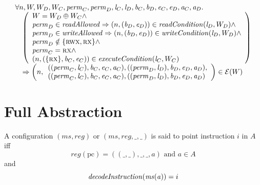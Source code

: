 \documentclass[a3paper]{article}
\newcommand{\npair}[2][n]{\left(#1,#2\right)}
\newcommand{\tand}{\text{ and }}
\newcommand{\typesetlr}[1]{\mathcal{#1}}
\newcommand{\lre}{\typesetlr{E}}
\newcommand{\sourcecolor}{\color{blue}}
\newcommand{\perm}{\var{perm}}
\newcommand{\lin}{\var{l}}
\newcommand{\var}[1]{\mathit{#1}}
\newcommand{\reg}{\var{reg}}
\newcommand{\ms}{\var{ms}}
\newcommand{\baddr}{\var{b}}
\newcommand{\eaddr}{\var{e}}
\newcommand{\aaddr}{\var{a}}
\newcommand{\pcreg}{\mathrm{pc}}
\newcommand{\plainperm}[1]{\textsc{#1}}
\newcommand{\rwx}{\plainperm{rwx}}
\newcommand{\rx}{\plainperm{rx}}
\newcommand{\plainfun}[2]{
  \ifthenelse{\equal{#2}{}}
  {\mathit{#1}}
  {\mathit{#1}(#2)}
}
\newcommand{\decInstr}[1]{\plainfun{decodeInstruction}{#1}}
\newcommand{\execCond}[1]{\plainfun{executeCondition}{#1}}
\newcommand{\readAllowed}[1]{\plainfun{readAllowed}{#1}}
\newcommand{\readCond}[1]{\plainfun{readCondition}{#1}}
\newcommand{\writeCond}[1]{\plainfun{writeCondition}{#1}}
\newcommand{\writeAllowed}[1]{\plainfun{writeAllowed}{#1}}
\begin{document}
\begin{theorem}[FTLR]
  \label{thm:ftlr}
  \[
    \begin{array}{l}
      \forall n,W,W_D,W_C,\perm_C,\perm_D,\lin_C,\lin_D,\baddr_C,\baddr_D,\eaddr_C,\eaddr_D,\aaddr_C,\aaddr_D \ldotp \\
      \quad \left(
      \begin{array}{l}
        W = W_D \oplus W_C \wedge \\
        \perm_D \in \readAllowed{} \Rightarrow \npair{(\baddr_D,\eaddr_D)} \in \readCond{\lin_D,W_D} \wedge\\
        \perm_D \in \writeAllowed{} \Rightarrow\npair{(\baddr_D,\eaddr_D)} \in \writeCond{\lin_D,W_D} \wedge\\
        \perm_D \notin \{\rwx,\rx\} \wedge \\
        \perm_C = \rx \wedge\\
        \npair{(\{\rx\},\baddr_C,\eaddr_C)} \in \execCond{\lin_C,W_C}
      \end{array}
      \right)\\
      \quad\Rightarrow 
      \npair{\array{l}((\perm_C,\lin_C),\baddr_C,\eaddr_C,\aaddr_C),((\perm_D,\lin_D),\baddr_D,\eaddr_D,\aaddr_D),\\
                      ((\perm_C,\lin_C),\baddr_C,\eaddr_C,\aaddr_C),((\perm_D,\lin_D),\baddr_D,\eaddr_D,\aaddr_D)\endarray} \in \lre(W)

    \end{array}
  \]
\end{theorem}

\section{Full Abstraction}
\begin{definition}
  \label{def:points-to-instr}
  A configuration $(\ms,\reg)$ {\sourcecolor or $(\ms,\reg,\_,\_)$} is said to point instruction $i$ in $A$ iff
  \[
    \reg(\pcreg) = ((\_,\_),\_,\_,\aaddr) \tand \aaddr \in A
  \]
and
\[
  \decInstr{\ms(\aaddr)} = i
\]
\end{definition}
\end{document}
